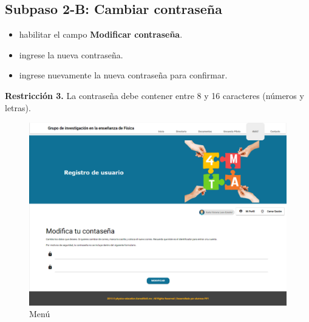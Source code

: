 

\subsection{Subpaso 2-B: Cambiar contraseña}
\begin{itemize}
	\item habilitar el campo \textbf{Modificar contraseña}.
	\item ingrese la nueva contraseña.
	\item ingrese nuevamente la nueva contraseña para confirmar.
\end{itemize}

\textbf{Restricción 3.} La contraseña debe contener entre 8 y 16
	caracteres (números y letras).
	
	\begin{figure}[hbt]
			\includegraphics[scale=0.3]{images/Interfaz/IUGS08_contrasena.png}
		\caption{Menú}
	\end{figure}